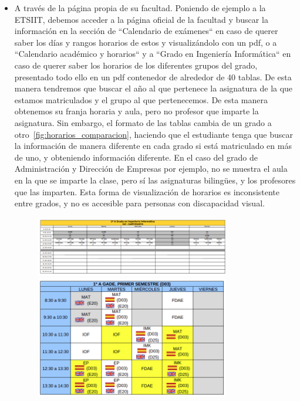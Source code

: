 \begin{itemize}
    \item A través de la página propia de su facultad. Poniendo de ejemplo a la ETSIIT, debemos acceder a la página oficial de la facultad \cite{webETSIIT} y buscar la información en la sección
          de ``Calendario de exámenes`` en caso de querer saber los días y rangos horarios de estos y visualizándolo con un pdf, o a ``Calendario académico y horarios`` y a ``Grado en Ingeniería Informática``
          en caso de querer saber los horarios de los diferentes grupos del grado, presentado todo ello en un pdf contenedor de alrededor de 40 tablas.
          \newline\newline
          De esta manera tendremos que buscar el año al que pertenece la asignatura de la que estamos matriculados y el grupo al que pertenecemos. De esta manera obtenemos su 
          franja horaria y aula, pero no profesor que imparte la asignatura.
          \newline\newline
          Sin embargo, el formato de las tablas cambia de un grado a otro~\ref{fig:horarios_comparacion}, haciendo que el estudiante tenga que buscar la información de manera diferente en cada grado si está matriculado en más de uno, 
          y obteniendo información diferente. En el caso del grado de Administración y Dirección de Empresas por ejemplo, no se muestra el aula en la que se imparte la clase, pero sí las asignaturas bilingües, y
          los profesores que las imparten.
          \newline\newline
          Esta forma de visualización de horarios es inconsistente entre grados, y no es accesible para personas con discapacidad visual.
          \newpage
            \begin{figure}[H]
                \centering
                \includegraphics[width=0.8\textwidth]{figures/02_etsiit_horario.png}
                \includegraphics[width=0.8\textwidth]{figures/02_ade_horario.png}

\end{figure}
\end{itemize}
